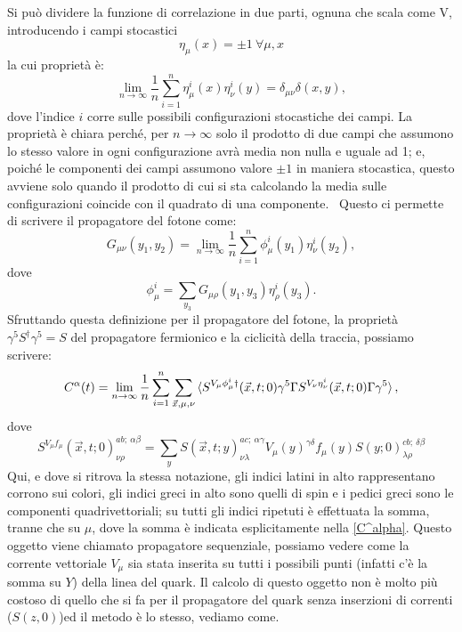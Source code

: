 \documentclass[LaM]{sapthesis}
\begin{document}
	Si può dividere la funzione di correlazione in due parti, ognuna che scala come V, introducendo i campi stocastici
	\begin{equation*}
		\eta_\mu(x)=\pm1 \ \forall\mu,x
	\end{equation*}
	la cui proprietà è:
	\begin{equation}
		\lim_{n\to \infty} \frac{1}{n}\sum_{i=1}^{n}\eta^i_\mu(x)\eta^i_\nu(y)=\delta_{\mu\nu}\delta(x,y),
	\end{equation}
	dove l'indice $i$ corre sulle possibili configurazioni stocastiche dei campi. \color{brown}La proprietà è chiara perché, per $n\to\infty$ solo il prodotto di due campi che assumono lo stesso valore in ogni configurazione avrà media non nulla e uguale ad 1; e, poiché le componenti dei campi assumono valore $\pm1$ in maniera stocastica, questo avviene solo quando il prodotto di cui si sta calcolando la media sulle configurazioni coincide con il quadrato di una componente.\color{black} \ Questo ci permette di scrivere il propagatore del fotone come:
	\begin{equation}
		G_{\mu\nu}(y_1,y_2)=\lim_{n\to \infty} \frac{1}{n}\sum_{i=1}^{n}\phi^i_\mu(y_1)\eta^i_\nu(y_2),
	\end{equation}
	dove
	\begin{equation*}
		\phi^i_\mu=\sum_{y_3} G_{\mu\rho}(y_1,y_3)\eta^i_\rho(y_3).
	\end{equation*}
	Sfruttando questa definizione per il propagatore del fotone, la proprietà $\gamma^5S^\dagger\gamma^5=S$ del propagatore fermionico e la ciclicità della traccia, possiamo scrivere:
	\begin{equation}
	\label{C^alpha}
		C^\alpha(t)=\lim_{n\to \infty} \frac{1}{n}\sum_{i=1}^{n}\sum_{\vec{x},\mu, \nu}\braket{S^{V_\mu\phi_\mu^i\dagger}(\vec{x},t;0)\gamma^5\Gamma S^{V_\nu\eta_\nu^i}(\vec{x},t;0)\Gamma\gamma^5},
	\end{equation}
	dove
	\begin{equation}
	\label{sequenziale}
		S^{V_\mu f_\mu}(\vec{x},t;0)_{\nu\rho}^{a b; \ \alpha \beta}=\sum_yS(\vec{x},t;y)_{\nu\lambda}^{a c; \ \alpha \gamma}V_\mu(y)^{\gamma \delta}f_\mu(y)S(y;0)_{\lambda\rho}^{c b; \ \delta \beta}
	\end{equation}
	Qui, e dove si ritrova la stessa notazione, gli indici latini in alto rappresentano corrono sui colori, gli indici greci in alto sono quelli di spin e i pedici greci sono le componenti quadrivettoriali; su tutti gli indici ripetuti è effettuata la somma, tranne che su $\mu$, dove la somma è indicata esplicitamente nella \eqref{C^alpha}. Questo oggetto viene chiamato propagatore sequenziale, possiamo vedere come la corrente vettoriale $V_\mu$ sia stata inserita su tutti i possibili punti (infatti c'è la somma su $Y$) della linea del quark. Il calcolo di questo oggetto non è molto più costoso di quello che si fa per il propagatore del quark senza inserzioni di correnti ($S(z,0)$)ed il metodo è lo stesso, vediamo come.
	
\end{document}
